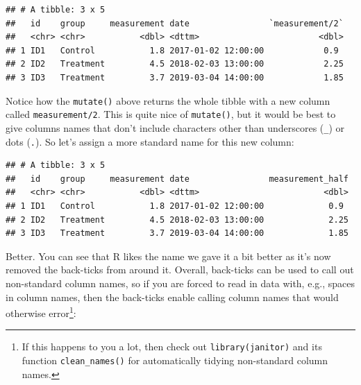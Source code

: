 \documentclass[
  12pt,
  krantz2]{krantz}
\makeatletter
\newenvironment{Shaded}{\begin{snugshade}}{\end{snugshade}}
\newcommand{\CommentTok}[1]{\textcolor[rgb]{0.56,0.35,0.01}{\textit{#1}}}
\newcommand{\DataTypeTok}[1]{\textcolor[rgb]{0.13,0.29,0.53}{#1}}
\newcommand{\DecValTok}[1]{\textcolor[rgb]{0.00,0.00,0.81}{#1}}
\newcommand{\KeywordTok}[1]{\textcolor[rgb]{0.13,0.29,0.53}{\textbf{#1}}}
\newcommand{\NormalTok}[1]{#1}
\newcommand{\OperatorTok}[1]{\textcolor[rgb]{0.81,0.36,0.00}{\textbf{#1}}}
\newcommand{\StringTok}[1]{\textcolor[rgb]{0.31,0.60,0.02}{#1}}
\newenvironment{kframe}{%
\medskip{}
\setlength{\fboxsep}{.8em}
 \def\at@end@of@kframe{}%
 \ifinner\ifhmode%
  \def\at@end@of@kframe{\end{minipage}}%
  \begin{minipage}{\columnwidth}%
 \fi\fi%
 \def\FrameCommand##1{\hskip\@totalleftmargin \hskip-\fboxsep
 \colorbox{shadecolor}{##1}\hskip-\fboxsep
     \hskip-\linewidth \hskip-\@totalleftmargin \hskip\columnwidth}%
 \MakeFramed {\advance\hsize-\width
   \@totalleftmargin\z@ \linewidth\hsize
   \@setminipage}}%
 {\par\unskip\endMakeFramed%
 \at@end@of@kframe}
\renewenvironment{Shaded}{\begin{kframe}}{\end{kframe}}
\makeatother
\begin{document}
\begin{verbatim}
## # A tibble: 3 x 5
##   id    group     measurement date                `measurement/2`
##   <chr> <chr>           <dbl> <dttm>                        <dbl>
## 1 ID1   Control           1.8 2017-01-02 12:00:00            0.9 
## 2 ID2   Treatment         4.5 2018-02-03 13:00:00            2.25
## 3 ID3   Treatment         3.7 2019-03-04 14:00:00            1.85
\end{verbatim}

Notice how the \texttt{mutate()} above returns the whole tibble with a new column called \texttt{measurement/2}.
This is quite nice of \texttt{mutate()}, but it would be best to give columns names that don't include characters other than underscores (\texttt{\_}) or dots (\texttt{.}).
So let's assign a more standard name for this new column:

\begin{Shaded}
\end{Shaded}

\begin{verbatim}
## # A tibble: 3 x 5
##   id    group     measurement date                measurement_half
##   <chr> <chr>           <dbl> <dttm>                         <dbl>
## 1 ID1   Control           1.8 2017-01-02 12:00:00             0.9 
## 2 ID2   Treatment         4.5 2018-02-03 13:00:00             2.25
## 3 ID3   Treatment         3.7 2019-03-04 14:00:00             1.85
\end{verbatim}

Better.
You can see that R likes the name we gave it a bit better as it's now removed the back-ticks from around it.
Overall, back-ticks can be used to call out non-standard column names, so if you are forced to read in data with, e.g., spaces in column names, then the back-ticks enable calling column names that would otherwise error\footnote{If this happens to you a lot, then check out \texttt{library(janitor)} and its function \texttt{clean\_names()} for automatically tidying non-standard column names.}:

\begin{Shaded}
\end{Shaded}
\end{document}
